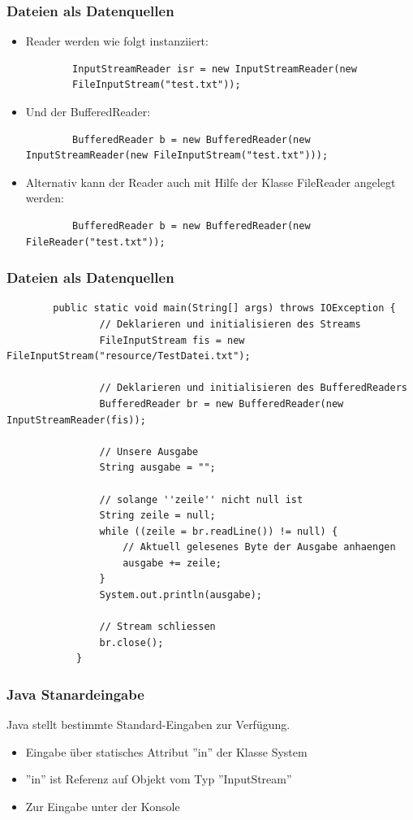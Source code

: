 \begin{frame}[fragile]
\frametitle{Dateien als Datenquellen}
	\begin{itemize}
	  \item Reader werden wie folgt instanziiert:\\
	  \begin{lstlisting}
	  	InputStreamReader isr = new InputStreamReader(new
	  	FileInputStream("test.txt"));
	  \end{lstlisting}
	  \item Und der BufferedReader:
	  \begin{lstlisting}
	  	BufferedReader b = new BufferedReader(new InputStreamReader(new FileInputStream("test.txt")));
	  \end{lstlisting}
	  \item  Alternativ kann der Reader auch mit Hilfe der Klasse FileReader
	  angelegt werden:
	  \begin{lstlisting}
		BufferedReader b = new BufferedReader(new FileReader("test.txt"));
	  \end{lstlisting}
	\end{itemize}
\end{frame}

\begin{frame}[fragile]
\frametitle{Dateien als Datenquellen}
	\begin{lstlisting}
		public static void main(String[] args) throws IOException {
				// Deklarieren und initialisieren des Streams
				FileInputStream fis = new FileInputStream("resource/TestDatei.txt");
				
				// Deklarieren und initialisieren des BufferedReaders
				BufferedReader br = new BufferedReader(new InputStreamReader(fis));
		
				// Unsere Ausgabe
				String ausgabe = "";
		
				// solange ''zeile'' nicht null ist
				String zeile = null;
				while ((zeile = br.readLine()) != null) {
					// Aktuell gelesenes Byte der Ausgabe anhaengen
					ausgabe += zeile;
				}
				System.out.println(ausgabe);
		
				// Stream schliessen
				br.close();
			}
	\end{lstlisting}
\end{frame}

\begin{frame}[fragile]
\frametitle{Java Stanardeingabe}
	Java stellt bestimmte Standard-Eingaben zur Verfügung.
	\begin{itemize}
	  \item Eingabe über statisches Attribut ''in'' der Klasse System
	  \item ''in'' ist Referenz auf Objekt vom Typ ''InputStream''
	  \item Zur Eingabe unter der Konsole
	\end{itemize}
\end{frame}


